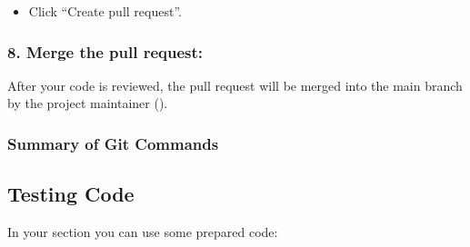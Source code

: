 \documentclass[letterpaper,10pt,english]{sphinxhowto}
\begin{document}
\begin{description}
\begin{itemize}
\item {} 
\sphinxAtStartPar
Click “Create pull request”.

\end{itemize}


\subsubsection{8. Merge the pull request:}
\label{\detokenize{get-started:merge-the-pull-request}}
\sphinxAtStartPar
After your code is reviewed, the pull request will be merged into the main branch by the project maintainer ().


\subsubsection{Summary of Git Commands}
\label{\detokenize{get-started:summary-of-git-commands}}
\begin{sphinxVerbatim}[commandchars=\\\{\}]
  
 

   

  
   

   
\end{sphinxVerbatim}


\subsection{Testing Code}
\label{\detokenize{get-started:testing-code}}
\sphinxAtStartPar
In your  section you can use some prepared code:


\end{description}
\end{document}
